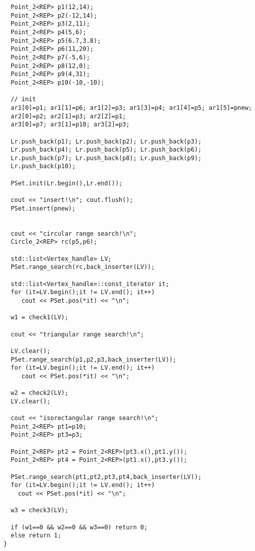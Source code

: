 \begin{verbatim}
  Point_2<REP> p1(12,14);
  Point_2<REP> p2(-12,14);  
  Point_2<REP> p3(2,11);
  Point_2<REP> p4(5,6);
  Point_2<REP> p5(6.7,3.8);
  Point_2<REP> p6(11,20);
  Point_2<REP> p7(-5,6);  
  Point_2<REP> p8(12,0);
  Point_2<REP> p9(4,31);
  Point_2<REP> p10(-10,-10); 
  
  // init 
  ar1[0]=p1; ar1[1]=p6; ar1[2]=p3; ar1[3]=p4; ar1[4]=p5; ar1[5]=pnew; 
  ar2[0]=p2; ar2[1]=p3; ar2[2]=p1;
  ar3[0]=p7; ar3[1]=p10; ar3[2]=p3;
  
  Lr.push_back(p1); Lr.push_back(p2); Lr.push_back(p3);
  Lr.push_back(p4); Lr.push_back(p5); Lr.push_back(p6);
  Lr.push_back(p7); Lr.push_back(p8); Lr.push_back(p9);
  Lr.push_back(p10); 

  PSet.init(Lr.begin(),Lr.end()); 

  cout << "insert!\n"; cout.flush();
  PSet.insert(pnew);


  cout << "circular range search!\n";  
  Circle_2<REP> rc(p5,p6);

  std::list<Vertex_handle> LV;
  PSet.range_search(rc,back_inserter(LV));

  std::list<Vertex_handle>::const_iterator it;
  for (it=LV.begin();it != LV.end(); it++)
     cout << PSet.pos(*it) << "\n";      
     
  w1 = check1(LV);
 
  cout << "triangular range search!\n";    
  
  LV.clear();
  PSet.range_search(p1,p2,p3,back_inserter(LV));
  for (it=LV.begin();it != LV.end(); it++)
     cout << PSet.pos(*it) << "\n";
    
  w2 = check2(LV);    
  LV.clear();
 
  cout << "isorectangular range search!\n";
  Point_2<REP> pt1=p10; 
  Point_2<REP> pt3=p3; 
  
  Point_2<REP> pt2 = Point_2<REP>(pt3.x(),pt1.y());
  Point_2<REP> pt4 = Point_2<REP>(pt1.x(),pt3.y());
  
  PSet.range_search(pt1,pt2,pt3,pt4,back_inserter(LV));
  for (it=LV.begin();it != LV.end(); it++)
    cout << PSet.pos(*it) << "\n"; 

  w3 = check3(LV);
  
  if (w1==0 && w2==0 && w3==0) return 0;
  else return 1;
}
\end{verbatim}

\ccHtmlLinksOn

